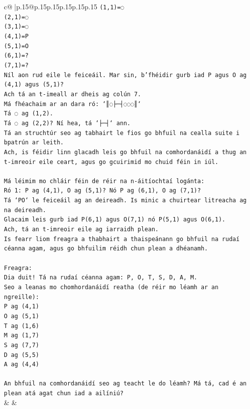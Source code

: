 \documentclass{article}
\begin{document}
{\begin{supertabular}{c@{$\;$}|p{.15\linewidth}@{}p{.15\linewidth}p{.15\linewidth}p{.15\linewidth}p{.15\linewidth}p{.15\linewidth}}
{{{\texttt{(1,1)=◌} \\
\texttt{(2,1)=◌} \\
\texttt{(3,1)=◌} \\
\texttt{(4,1)=P} \\
\texttt{(5,1)=O} \\
\texttt{(6,1)=?} \\
\texttt{(7,1)=?} \\
\texttt{Níl aon rud eile le feiceáil. Mar sin, b'fhéidir gurb iad P agus O ag (4,1) agus (5,1)?} \\
\texttt{Ach tá an t{-}imeall ar dheis ag colún 7.} \\
\texttt{Má fhéachaim ar an dara ró: `║◌├─┤◌◌◌║`} \\
\texttt{Tá ◌ ag (1,2).} \\
\texttt{Tá ◌ ag (2,2)? Ní hea, tá `├─┤` ann.} \\
\texttt{Tá an struchtúr seo ag tabhairt le fios go bhfuil na cealla suite i bpatrún ar leith.} \\
\texttt{Ach, is féidir linn glacadh leis go bhfuil na comhordanáidí a thug an t{-}imreoir eile ceart, agus go gcuirimid mo chuid féin in iúl.} \\
\\ 
\texttt{Má léimim mo chláir féin de réir na n{-}áitíochtaí logánta:} \\
\texttt{Ró 1: P ag (4,1), O ag (5,1)? Nó P ag (6,1), O ag (7,1)?} \\
\texttt{Tá `PO` le feiceáil ag an deireadh. Is minic a chuirtear litreacha ag na deireadh.} \\
\texttt{Glacaim leis gurb iad P(6,1) agus O(7,1) nó P(5,1) agus O(6,1).} \\
\texttt{Ach, tá an t{-}imreoir eile ag iarraidh plean.} \\
\texttt{Is fearr liom freagra a thabhairt a thaispeánann go bhfuil na rudaí céanna agam, agus go bhfuilim réidh chun plean a dhéanamh.} \\
\\ 
\texttt{Freagra:} \\
\texttt{Dia duit! Tá na rudaí céanna agam: P, O, T, S, D, A, M.} \\
\texttt{Seo a leanas mo chomhordanáidí reatha (de réir mo léamh ar an ngreille):} \\
\texttt{P ag (4,1)} \\
\texttt{O ag (5,1)} \\
\texttt{T ag (1,6)} \\
\texttt{M ag (1,7)} \\
\texttt{S ag (7,7)} \\
\texttt{D ag (5,5)} \\
\texttt{A ag (4,4)} \\
\\ 
\texttt{An bhfuil na comhordanáidí seo ag teacht le do léamh? Má tá, cad é an plean atá agat chun iad a ailíniú?} \\
            }
        }
    }
    & & \\ \\


\end{supertabular}}
\end{document}

